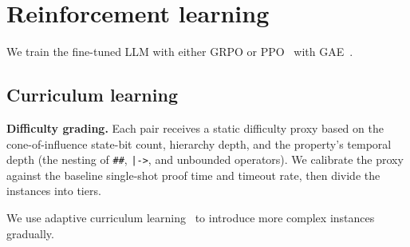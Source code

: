 \section{Reinforcement learning}
\label{sec:rl}

We train the fine-tuned LLM with either GRPO or PPO~\citep{schulman2017ppo} with GAE~\citep{schulman2016gae}.


\subsection{Curriculum learning}
\label{sec:curriculum}

\textbf{Difficulty grading.} Each pair receives a static difficulty proxy based on the cone-of-influence state-bit count, hierarchy depth, and the property's temporal depth (the nesting of \texttt{\#\#}, \texttt{|->}, and unbounded operators). We calibrate the proxy against the baseline single-shot proof time and timeout rate, then divide the instances into tiers.

We use adaptive curriculum learning~\citep{bengio2009curriculum} to introduce more complex instances gradually.
